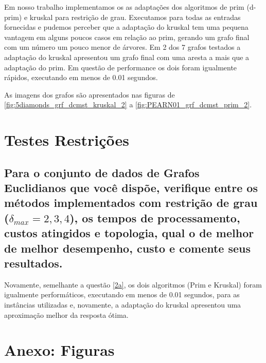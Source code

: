 \documentclass[12pt,a4paper]{article}
\begin{document}
Em nosso trabalho implementamos os as adaptações dos algoritmos de prim (d-prim)
e kruskal para restrição de grau. Executamos para todas as entradas fornecidas e
pudemos perceber que a adaptação do kruskal tem uma pequena vantagem em alguns
poucos casos em relação ao prim, gerando um grafo final com um número um pouco
menor de árvores. Em 2 dos 7 grafos testados a adaptação do kruskal apresentou
um grafo final com uma aresta a mais que a adaptação do prim. Em questão de
performance os dois foram igualmente rápidos, executando em menos de 0.01
segundos.

As imagens dos grafos são apresentados nas figuras de
\ref{fig:5diamonds_grf_dcmst_kruskal_2} a \ref{fig:PEARN01_grf_dcmst_prim_2}.



\section{Testes Restrições}
\subsection{Para o conjunto de dados de Grafos Euclidianos que você dispõe,
verifique entre os métodos implementados com restrição de grau ($\delta_{max}=2,
3, 4$), os tempos de processamento, custos atingidos e topologia, qual o de
melhor de melhor desempenho, custo e comente seus resultados.}

Novamente, semelhante a questão \ref{2a}, os dois algoritmos (Prim e Kruskal)
foram igualmente performáticos, executando em menos de 0.01 segundos, para as
instâncias utilizadas e, novamente, a adaptação do kruskal apresentou uma
aproximação melhor da resposta ótima.



\section{Anexo: Figuras}
\end{document}
